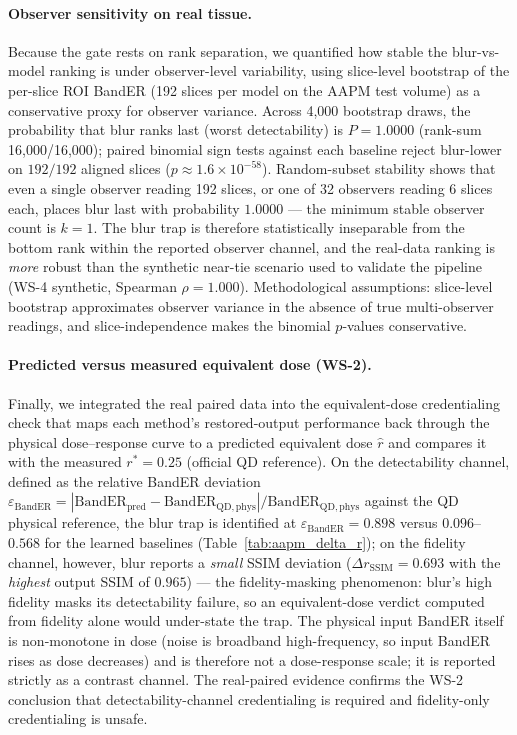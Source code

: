 \documentclass[twoside,11pt]{article}
\begin{document}
\paragraph{Observer sensitivity on real tissue.}
Because the gate rests on rank separation, we quantified how stable the blur-vs-model ranking is under observer-level variability, using slice-level bootstrap of the per-slice ROI BandER (192 slices per model on the AAPM test volume) as a conservative proxy for observer variance. Across 4{,}000 bootstrap draws, the probability that blur ranks last (worst detectability) is $P=1.0000$ (rank-sum 16{,}000/16{,}000); paired binomial sign tests against each baseline reject blur-lower on $192/192$ aligned slices ($p\approx1.6\times10^{-58}$). Random-subset stability shows that even a single observer reading 192 slices, or one of 32 observers reading 6 slices each, places blur last with probability $1.0000$ --- the minimum stable observer count is $k=1$. The blur trap is therefore statistically inseparable from the bottom rank within the reported observer channel, and the real-data ranking is \emph{more} robust than the synthetic near-tie scenario used to validate the pipeline (WS-4 synthetic, Spearman $\rho=1.000$). Methodological assumptions: slice-level bootstrap approximates observer variance in the absence of true multi-observer readings, and slice-independence makes the binomial $p$-values conservative.

\paragraph{Predicted versus measured equivalent dose (WS-2).}
Finally, we integrated the real paired data into the equivalent-dose credentialing check that maps each method's restored-output performance back through the physical dose--response curve to a predicted equivalent dose $\hat{r}$ and compares it with the measured $r^{*}=0.25$ (official QD reference). On the detectability channel, defined as the relative BandER deviation $\varepsilon_{\mathrm{BandER}} = |\mathrm{BandER}_{\mathrm{pred}} - \mathrm{BandER}_{\mathrm{QD,phys}}| / \mathrm{BandER}_{\mathrm{QD,phys}}$ against the QD physical reference, the blur trap is identified at $\varepsilon_{\mathrm{BandER}} = 0.898$ versus $0.096$--$0.568$ for the learned baselines (Table~\ref{tab:aapm_delta_r}); on the fidelity channel, however, blur reports a \emph{small} SSIM deviation ($\Delta r_{\mathrm{SSIM}}=0.693$ with the \emph{highest} output SSIM of $0.965$) --- the fidelity-masking phenomenon: blur's high fidelity masks its detectability failure, so an equivalent-dose verdict computed from fidelity alone would under-state the trap. The physical input BandER itself is non-monotone in dose (noise is broadband high-frequency, so input BandER rises as dose decreases) and is therefore not a dose-response scale; it is reported strictly as a contrast channel. The real-paired evidence confirms the WS-2 conclusion that detectability-channel credentialing is required and fidelity-only credentialing is unsafe.
\end{document}
